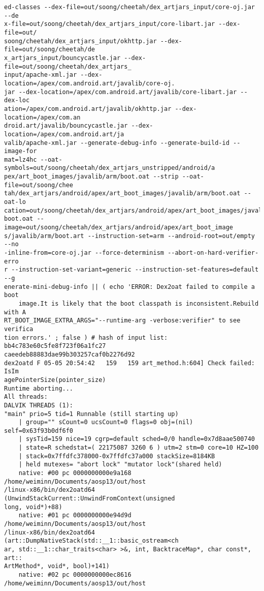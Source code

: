 \begin{lstlisting}
ed-classes --dex-file=out/soong/cheetah/dex_artjars_input/core-oj.jar --de
x-file=out/soong/cheetah/dex_artjars_input/core-libart.jar --dex-file=out/
soong/cheetah/dex_artjars_input/okhttp.jar --dex-file=out/soong/cheetah/de
x_artjars_input/bouncycastle.jar --dex-file=out/soong/cheetah/dex_artjars_
input/apache-xml.jar --dex-location=/apex/com.android.art/javalib/core-oj.
jar --dex-location=/apex/com.android.art/javalib/core-libart.jar --dex-loc
ation=/apex/com.android.art/javalib/okhttp.jar --dex-location=/apex/com.an
droid.art/javalib/bouncycastle.jar --dex-location=/apex/com.android.art/ja
valib/apache-xml.jar --generate-debug-info --generate-build-id --image-for
mat=lz4hc --oat-symbols=out/soong/cheetah/dex_artjars_unstripped/android/a
pex/art_boot_images/javalib/arm/boot.oat --strip --oat-file=out/soong/chee
tah/dex_artjars/android/apex/art_boot_images/javalib/arm/boot.oat --oat-lo
cation=out/soong/cheetah/dex_artjars/android/apex/art_boot_images/javalib/
boot.oat --image=out/soong/cheetah/dex_artjars/android/apex/art_boot_image
s/javalib/arm/boot.art --instruction-set=arm --android-root=out/empty --no
-inline-from=core-oj.jar --force-determinism --abort-on-hard-verifier-erro
r --instruction-set-variant=generic --instruction-set-features=default --g
enerate-mini-debug-info || ( echo 'ERROR: Dex2oat failed to compile a boot
    image.It is likely that the boot classpath is inconsistent.Rebuild with A
RT_BOOT_IMAGE_EXTRA_ARGS="--runtime-arg -verbose:verifier" to see verifica
tion errors.' ; false ) # hash of input list: bb4c783e60c5fe8f723f06a1fc27
caeedeb88883dae99b303257caf0b2276d92
dex2oatd F 05-05 20:54:42   159   159 art_method.h:604] Check failed: IsIm
agePointerSize(pointer_size) 
Runtime aborting...
All threads:
DALVIK THREADS (1):
"main" prio=5 tid=1 Runnable (still starting up)
    | group="" sCount=0 ucsCount=0 flags=0 obj=(nil) self=0x63f93b0df6f0
    | sysTid=159 nice=19 cgrp=default sched=0/0 handle=0x7d8aae500740
    | state=R schedstat=( 22175087 3260 6 ) utm=2 stm=0 core=10 HZ=100
    | stack=0x7ffdfc378000-0x7ffdfc37a000 stackSize=8184KB
    | held mutexes= "abort lock" "mutator lock"(shared held)
    native: #00 pc 0000000000e9a168  /home/weiminn/Documents/aosp13/out/host
/linux-x86/bin/dex2oatd64 (UnwindStackCurrent::UnwindFromContext(unsigned 
long, void*)+88)
    native: #01 pc 0000000000e94d9d  /home/weiminn/Documents/aosp13/out/host
/linux-x86/bin/dex2oatd64 (art::DumpNativeStack(std::__1::basic_ostream<ch
ar, std::__1::char_traits<char> >&, int, BacktraceMap*, char const*, art::
ArtMethod*, void*, bool)+141)
    native: #02 pc 0000000000ec8616  /home/weiminn/Documents/aosp13/out/host

\end{lstlisting}
